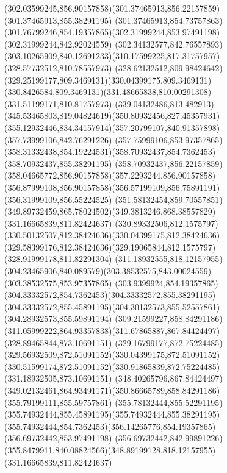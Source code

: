 {{	\curveto(302.03599245,856.90157858)(301.37465913,856.22157859)(301.37465913,855.38291195)
	\curveto(301.37465913,854.73757863)(301.76799246,854.19357865)(302.31999244,853.97491198)
	\lineto(302.31999244,842.92024559)
	\lineto(302.34132577,842.76557893)
	\curveto(303.10265909,840.12691233)(310.17599225,817.31757957)(328.57732512,810.78557973)
	\curveto(328.62132512,809.98424642)(329.25199177,809.3469131)(330.04399175,809.3469131)
	\curveto(330.8426584,809.3469131)(331.48665838,810.00291308)(331.51199171,810.81757973)
	\curveto(339.04132486,813.482913)(345.53465803,819.04824619)(350.80932456,827.45357931)
	\curveto(355.12932446,834.34157914)(357.20799107,840.91357898)(357.73999106,842.76291226)
	\lineto(357.75999106,853.97357865)
	\curveto(358.31332438,854.19224531)(358.70932437,854.7362453)(358.70932437,855.38291195)
	\curveto(358.70932437,856.22157859)(358.04665772,856.90157858)(357.2293244,856.90157858)
	\curveto(356.87999108,856.90157858)(356.57199109,856.75891191)(356.31999109,856.55224525)
	\curveto(351.58132454,859.70557851)(349.89732459,865.78024502)(349.3813246,868.38557829)
	\moveto(331.16665839,811.82424637)
	\curveto(330.89332506,812.1575797)(330.50132507,812.38424636)(330.04399175,812.38424636)
	\curveto(329.58399176,812.38424636)(329.19065844,812.1575797)(328.91999178,811.82291304)
	\curveto(311.18932555,818.12157955)(304.23465906,840.089579)(303.38532575,843.00024559)
	\lineto(303.38532575,853.97357865)
	\curveto(303.9399924,854.19357865)(304.33332572,854.7362453)(304.33332572,855.38291195)
	\curveto(304.33332572,855.45891195)(304.30132573,855.52557861)(304.28932573,855.59891194)
	\curveto(309.21599227,858.84291186)(311.05999222,864.93357838)(311.67865887,867.84424497)
	\lineto(328.89465844,873.10691151)
	\curveto(329.16799177,872.75224485)(329.56932509,872.51091152)(330.04399175,872.51091152)
	\curveto(330.51599174,872.51091152)(330.91865839,872.75224485)(331.18932505,873.10691151)
	\lineto(348.40265796,867.84424497)
	\curveto(349.02132461,864.93491171)(350.86665789,858.84291186)(355.79199111,855.59757861)
	\curveto(355.78132444,855.52291195)(355.74932444,855.45891195)(355.74932444,855.38291195)
	\curveto(355.74932444,854.7362453)(356.14265776,854.19357865)(356.69732442,853.97491198)
	\lineto(356.69732442,842.99891226)
	\curveto(355.8479911,840.08824566)(348.89199128,818.12157955)(331.16665839,811.82424637)
}
}
{
}
